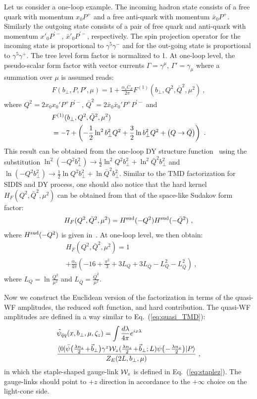 Let us consider a one-loop example. The incoming hadron state consists of a free quark with momentum $x_0P^+$ and a free anti-quark with momentum $\bar x_0 P^+$. Similarly the outgoing state consists of a pair of free quark and anti-quark with momentum $x'_0P^{'-}$, $\bar x'_0 P^{'-}$, respectively. The spin projection operator for the incoming state is proportional to $\gamma^5 \gamma^-$ and for the out-going state is proportional to $\gamma^5 \gamma^+$. The tree level form factor is normalized to 1. At one-loop level, the pseudo-scalar form factor with vector currents $\Gamma=\gamma^{\mu}$, $\Gamma'=\gamma_{\mu}$ where a summation over $\mu$ is assumed reads:
\begin{align}
	F(b_\perp,P,P',\mu)=1+\frac{\alpha_s C_F}{2\pi}F^{(1)}(b_\perp,Q^2,\bar Q^2,\mu^2)\ ,
\end{align}
where $Q^2=2x_0x_0'P^+P^{'-}$, $\bar Q^2=2\bar x_0\bar x_0'P^+P^{'-}$ and
\begin{align}
	&F^{(1)}(b_\perp,Q^2,\bar Q^2,\mu^2) \\
	&=-7+\left(-\frac{1}{2}\ln^2 b^2_\perp Q^2+\frac{3}{2}\ln b^2_\perp Q^2+\left(Q \rightarrow \bar Q\right)\right) \ . \nonumber
\end{align}
This result can be obtained from the one-loop DY structure function~\cite{DAlesio:2014mrz} using the substitution $\ln^2(-Q^2b^2_\perp)\rightarrow \frac{1}{2}\ln^2 Q^2b^2_\perp+\ln^2 \bar Q^2b^2_\perp$ and $\ln(-Q^2b^2_\perp)\rightarrow \frac{1}{2}\ln Q^2b^2_\perp+\ln \bar Q^2b^2_\perp$. Similar to the TMD factorization for SIDIS and DY process, one should also notice that the hard kernel $H_F(Q^2,\bar Q^2,\mu^2)$ can be obtained from that of the space-like Sudakov form factor:
\begin{align}
	H_F(Q^2,\bar Q^2,\mu^2)=H^{\rm sud}(-Q^2)H^{\rm sud}(-\bar Q^2) \ ,
\end{align}
where $H^{\rm sud}(-Q^2)$ is given in~\cite{Collins:2017oxh}. At one-loop level, we then obtain:
\begin{align}
	& H_F(Q^2,\bar Q^2,\mu^2)=1\nonumber \\
	&+\frac{\alpha_s}{4\pi}\left(-16+\frac{\pi^2}{3}+3L_Q+3L_{\bar Q}-L_Q^2-L_{\bar Q}^2\right)  \ ,
\end{align}
where $L_Q=\ln \frac{Q^2}{\mu^2}$ and $L_{\bar Q}=\frac{\bar Q^2}{\mu^2}$.

Now we construct the Euclidean version of the factorization in terms of the quasi-WF amplitudes,
the reduced soft function, and hard contribution. The quasi-WF amplitudes are defined in a way similar to Eq.~(\ref{eq:quasi_TMD}):
\begin{align}
	&\tilde \psi_{\bar q q}(x,b_\perp,\mu,\zeta_z)=\int \frac{d\lambda}{4\pi}e^{ix\lambda}\nonumber\\
	&\frac{\langle 0| \bar \psi\big(\frac{\lambda n_z }{2}\!+\!\vec{b}_\perp\big)\gamma^z{\cal W}_{z}(\frac{\lambda n_z}{2}\!+\!\vec{b}_\perp;L)\psi\big(\!-\!\frac{\lambda n_z}{2}\big) |P\rangle}{Z_E(2L,b_\perp,\mu)} \ ,
\end{align}
in which the staple-shaped gauge-link ${\cal W}_z$ is defined in Eq.~(\ref{eq:staplez}). The gauge-links should point to $+z$ direction in accordance to the $+\infty$ choice on the light-cone side.

